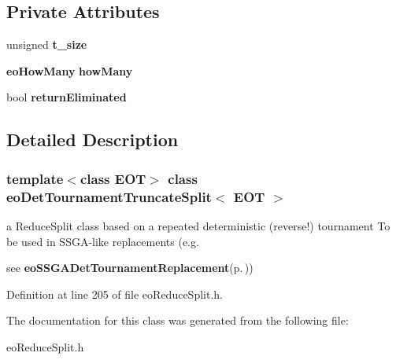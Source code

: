 \subsection*{Private Attributes}
\begin{CompactItemize}
\item 
unsigned {\bf t\_\-size}\label{classeo_det_tournament_truncate_split_r0}

\item 
{\bf eo\-How\-Many} {\bf how\-Many}\label{classeo_det_tournament_truncate_split_r1}

\item 
bool {\bf return\-Eliminated}\label{classeo_det_tournament_truncate_split_r2}

\end{CompactItemize}


\subsection{Detailed Description}
\subsubsection*{template$<$class EOT$>$ class eo\-Det\-Tournament\-Truncate\-Split$<$ EOT $>$}

a Reduce\-Split class based on a repeated deterministic (reverse!) tournament To be used in SSGA-like replacements (e.g. 

see {\bf eo\-SSGADet\-Tournament\-Replacement}{\rm (p.\,\pageref{classeo_s_s_g_a_det_tournament_replacement})}) 



Definition at line 205 of file eo\-Reduce\-Split.h.

The documentation for this class was generated from the following file:\begin{CompactItemize}
\item 
eo\-Reduce\-Split.h\end{CompactItemize}
